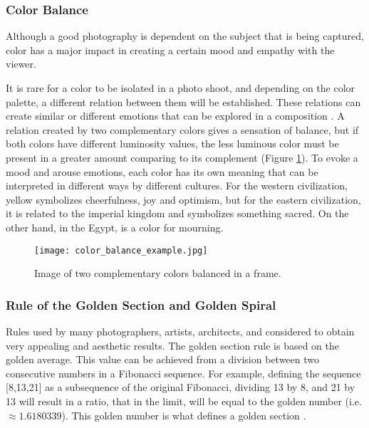 \subsubsection{Color Balance}
\label{subsub:color_balance}

Although a good photography is dependent on the subject that is being captured, color has a major impact in creating a certain mood and empathy with the viewer. 

It is rare for a color to be isolated in a photo shoot, and depending on the color palette, a different relation between them will be established. These relations can create similar or different emotions that can be explored in a composition \cite{Santos}.
A relation created by two complementary colors gives a sensation of balance, but if both colors have different luminosity values, the less luminous color must be present in a greater amount comparing to its complement (Figure \ref{fig:color_balance_image}).
To evoke a mood and arouse emotions, each color has its own meaning that can be interpreted in different ways by different cultures. For the western civilization, yellow symbolizes cheerfulness, joy and optimism, but for the eastern civilization, it is related to the imperial kingdom and symbolizes something sacred. On the other hand, in the Egypt, is a color for mourning.

\begin{figure}[htbp]
    \centering
	\label{fig:color_balance_example}
    \texttt{[image: color\_balance\_example.jpg]}
  \caption{Image of two complementary colors balanced in a frame. \cite{Santos}}
  \label{fig:color_balance_image}
\end{figure}

\subsubsection{Rule of the Golden Section and Golden Spiral}
\label{subsub:golden_section}

Rules used by many photographers, artists, architects, and considered to obtain very appealing and aesthetic results. The golden section rule is based on the golden average. This value can be achieved from a division between two consecutive numbers in a Fibonacci sequence. For example, defining the sequence [8,13,21] as a subsequence of the original Fibonacci, dividing 13 by 8, and 21 by 13 will result in a ratio, that in the limit, will be equal to the golden number (i.e. $\approx 1.6180339$). This golden number is what defines a golden section \cite{Santos}. 

